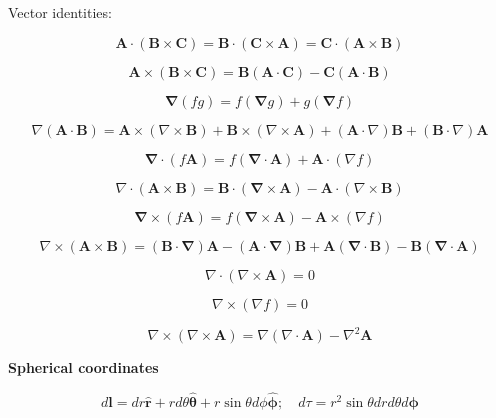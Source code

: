 \documentclass[11pt]{article}
\begin{document}
\pagebreak

Vector identities:

\[
\mathbf { A } \cdot ( \mathbf { B } \times \mathbf { C } ) = \mathbf { B } \cdot ( \mathbf { C } \times \mathbf { A } ) = \mathbf { C } \cdot ( \mathbf { A } \times \mathbf { B } )
\]


\[
\mathbf { A } \times ( \mathbf { B } \times \mathbf { C } ) = \mathbf { B } ( \mathbf { A } \cdot \mathbf { C } ) - \mathbf { C } ( \mathbf { A } \cdot \mathbf { B } )
\]


\[
\boldsymbol { \nabla } ( f g ) = f ( \boldsymbol { \nabla } g ) + g ( \boldsymbol { \nabla } f )
\]


\[
\nabla ( \mathbf { A } \cdot \mathbf { B } ) = \mathbf { A } \times ( \nabla \times \mathbf { B } ) + \mathbf { B } \times ( \nabla \times \mathbf { A } ) + ( \mathbf { A } \cdot \nabla ) \mathbf { B } + ( \mathbf { B } \cdot \nabla ) \mathbf { A }
\]


\[
\boldsymbol { \nabla } \cdot ( f \mathbf { A } ) = f ( \mathbf { \nabla } \cdot \mathbf { A } ) + \mathbf { A } \cdot ( \nabla f )
\]


\[
\nabla \cdot ( \mathbf { A } \times \mathbf { B } ) = \mathbf { B } \cdot ( \mathbf { \nabla } \times \mathbf { A } ) - \mathbf { A } \cdot ( \nabla \times \mathbf { B } )
\]


\[
\boldsymbol { \nabla } \times ( f \mathbf { A } ) = f ( \mathbf { \nabla } \times \mathbf { A } ) - \mathbf { A } \times ( \nabla f )
\]


\[
\nabla \times ( \mathbf { A } \times \mathbf { B } ) = ( \mathbf { B } \cdot \mathbf { \nabla } ) \mathbf { A } - ( \mathbf { A } \cdot \mathbf { \nabla } ) \mathbf { B } + \mathbf { A } ( \mathbf { \nabla } \cdot \mathbf { B } ) - \mathbf { B } ( \mathbf { \nabla } \cdot \mathbf { A } )
\]


\[
\nabla \cdot ( \nabla \times \mathbf { A } ) = 0
\]


\[
\nabla \times ( \nabla f ) = 0
\]


\[
\nabla \times ( \nabla \times \mathbf { A } ) = \nabla ( \nabla \cdot \mathbf { A } ) - \nabla ^ { 2 } \mathbf { A }
\]

\newpage

{\bf Spherical coordinates}

\[
d \mathbf { l } = d r \hat { \mathbf { r } } + r d \theta \hat { \boldsymbol { \theta } } + r \sin \theta d \phi \hat { \boldsymbol { \phi } } ; \quad d \tau = r ^ { 2 } \sin \theta d r d \theta d \boldsymbol { \phi }
\]
\end{document}
